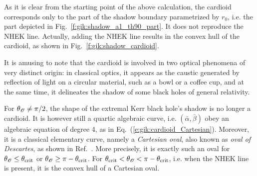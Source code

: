 As it is clear from the starting point of the above calculation, the cardioid corresponds only to the part of the shadow boundary parametrized by $r_0$, i.e. the part depicted in
Fig.~\ref{f:gik:shadow_a1_th90_part}. It does not reproduce the NHEK line. Actually, adding
the NHEK line results in the convex hull of the cardioid, as shown in Fig.~\ref{f:gik:shadow_cardioid}.

\begin{remark}
It is amusing to note that the cardioid is involved in two optical phenomena of
very distinct origin: in classical optics, it appears as
the caustic generated by reflection of light on a circular material, such as a bowl or
a coffee cup, and at the same time, it delineates the shadow of
some black holes of general relativity.
\end{remark}

\begin{remark}
For $\theta_{\mathscr{O}}\neq \pi/2$, the shape of the extremal Kerr black hole's shadow
is no longer a cardioid. It is however still a quartic algebraic curve,
i.e. $(\bar{\alpha},\bar{\beta})$ obey an algebraic equation of degree 4,
as in Eq.~(\ref{e:gik:cardioid_Cartesian}). Moreover, it is a classical elementary curve,
namely a \emph{Cartesian oval}, also
known as \emph{oval of Descartes},
as shown in Ref.~\cite{GrallL20c}. More precisely, it is exactly such an oval
for $\theta_{\mathscr{O}} \leq  \theta_{\rm crit}$ or $\theta_{\mathscr{O}} \geq \pi - \theta_{\rm crit}$.
For $\theta_{\rm crit}  < \theta_{\mathscr{O}} < \pi - \theta_{\rm crit}$, i.e. when the NHEK line is present, it is the convex hull of a Cartesian oval.
\end{remark}

